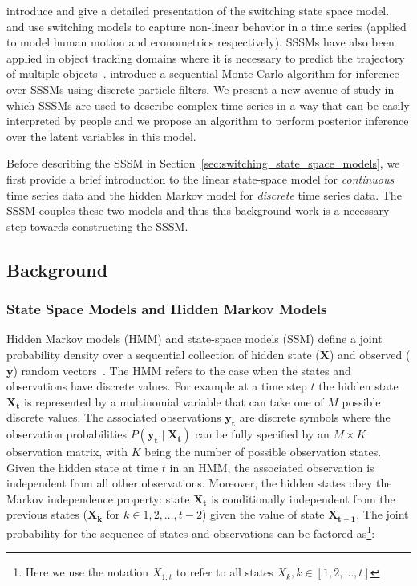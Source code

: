 \citet{ghahramani2000variational} introduce and give a detailed presentation of the switching state space model. \citet{pavlovic2001learning} and \citet{giordani2007unified} use switching models to capture non-linear behavior in a time series (applied to model human motion and econometrics respectively). SSSMs have also been applied in object tracking domains where it is necessary to predict the trajectory of multiple objects~\citep{fox2007hierarchical}. \citet{whiteley2010efficient} introduce a sequential Monte Carlo algorithm for inference over SSSMs using discrete particle filters. We present a new avenue of study in which SSSMs are used to describe complex time series in a way that can be easily interpreted by people and we propose an algorithm to perform posterior inference over the latent variables in this model.

Before describing the SSSM in Section~\ref{sec:switching_state_space_models}, we first provide a brief introduction to the linear state-space model for \textit{continuous} time series data and the hidden Markov model for \textit{discrete} time series data. The SSSM couples these two models and thus this background work is a necessary step towards constructing the SSSM.


\subsection{Background}
\subsubsection{State Space Models and Hidden Markov Models}\label{sec:state_space_and_hidden_markov_models}
Hidden Markov models (HMM) and state-space models (SSM) define a joint probability density over a sequential collection of hidden state ($\mathbf{X}$) and observed ($\mathbf{y}$) random vectors~\citep{ghahramani2001introduction,shumway2000time}. The HMM refers to the case when the states and observations have discrete values. For example at a time step $t$ the hidden state $\mathbf{X_t}$ is represented by a multinomial variable that can take one of $M$ possible discrete values. The associated observations $\mathbf{y_t}$ are discrete symbols where the observation probabilities $P(\mathbf{y_t} \mid \mathbf{X_t})$ can be fully specified by an $M \times K$ observation matrix, with $K$ being the number of possible observation states. Given the hidden state at time $t$ in an HMM, the associated observation is independent from all other observations. Moreover, the hidden states obey the Markov independence property: state $\mathbf{X_{t}}$ is conditionally independent from the previous states ($\mathbf{X_{k}}$ for $k \in 1,2, \hdots, t-2$) given the value of state $\mathbf{X_{t-1}}$. The joint probability for the sequence of states and observations can be factored as\footnote{Here we use the notation $X_{1:t}$ to refer to all states $X_k, k \in [1,2,\hdots,t]$}:


